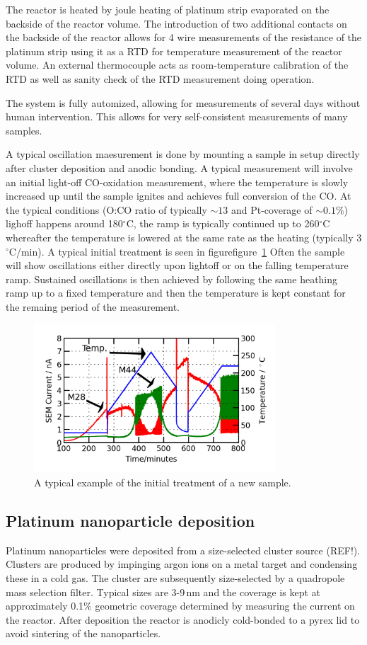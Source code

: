 \documentclass[8.5pt,twoside,twocolumn]{article}
\begin{document}
The reactor is heated by joule heating of platinum strip evaporated on the backside of the reactor volume. The introduction of two additional contacts on the backside of the reactor allows for 4 wire measurements of the resistance of the platinum strip using it as a RTD for temperature measurement of the reactor volume. An external thermocouple acts as room-temperature calibration of the RTD as well as sanity check of the RTD measurement doing operation.

The system is fully automized, allowing for measurements of several days without human intervention. This allows for very self-consistent measurements of many samples.

A typical oscillation maesurement is done by mounting a sample in setup directly after cluster deposition and anodic bonding. A typical measurement will involve an initial light-off CO-oxidation measurement, where the temperature is slowly increased up until the sample ignites and achieves full conversion of the CO. At the typical conditions (O:CO ratio of typically $\sim13$ and Pt-coverage of $\sim0.1\%$) lighoff happens around 180$^\circ$C, the ramp is typically continued up to 260$^\circ$C whereafter the temperature is lowered at the same rate as the heating (typically 3$^\circ$C/min). A typical initial treatment is seen in figurefigure~\ref{fgr:initial_treatment} Often the sample will show oscillations either directly upon lightoff or on the falling temperature ramp. Sustained oscillations is then achieved by following the same heathing ramp up to a fixed temperature and then the temperature is kept constant for the remaing period of the measurement.
\begin{figure}[h]
\centering
  \includegraphics[width=9cm]{initial_treatment.png}
  \caption{A typical example of the initial treatment of a new sample.}
  \label{fgr:initial_treatment}
\end{figure}




\subsection{Platinum nanoparticle deposition}
Platinum nanoparticles were deposited from a size-selected cluster source (REF!). Clusters are produced by impinging argon ions on a metal target and condensing these in a cold gas. The cluster are subsequently size-selected by a quadropole mass selection filter. Typical sizes are 3-9\,nm and the coverage is kept at approximately 0.1\% geometric coverage determined by measuring the current on the reactor. After deposition the reactor is anodicly cold-bonded \cite{Vesborg2010} to a pyrex lid to avoid sintering of the nanoparticles.
\end{document}

